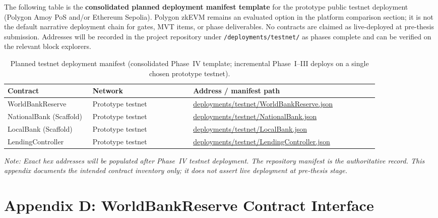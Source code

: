 \documentclass[12pt,a4paper]{report}
\newcommand{\tableheadcolor}{\rowcolor{TableHeadBg}}
\newcommand{\tableheadfont}{\bfseries}
\begin{document}
The following table is the \textbf{consolidated planned deployment manifest template} for the prototype public testnet deployment (Polygon Amoy PoS and/or Ethereum Sepolia). Polygon zkEVM remains an evaluated option in the platform comparison section; it is not the default narrative deployment chain for gates, MVT items, or phase deliverables. No contracts are claimed as live-deployed at pre-thesis submission. Addresses will be recorded in the project repository under \texttt{/deployments/testnet/} as phases complete and can be verified on the relevant block explorers.

\begin{table}[H]
\centering
\caption[Planned testnet deployment manifest]{Planned testnet deployment manifest (consolidated Phase~IV template; incremental Phase~I--III deploys on a single chosen prototype testnet).}
\label{tab:cardona-manifest}
\begingroup
\footnotesize
\setlength{\tabcolsep}{4pt}
\renewcommand{\arraystretch}{1.15}
\begin{tabular}{@{}%
  >{\raggedright\arraybackslash}p{0.22\linewidth}%
  >{\raggedright\arraybackslash}p{0.26\linewidth}%
  >{\raggedright\arraybackslash}p{0.48\linewidth}@{}}
\toprule
\tableheadcolor
\tableheadfont Contract & \tableheadfont Network & \tableheadfont Address / manifest path \\
\midrule
WorldBankReserve & Prototype testnet & \url{deployments/testnet/WorldBankReserve.json} \\
\rowcolor{RowShade}
NationalBank (Scaffold) & Prototype testnet & \url{deployments/testnet/NationalBank.json} \\
LocalBank (Scaffold) & Prototype testnet & \url{deployments/testnet/LocalBank.json} \\
\rowcolor{RowShade}
LendingController & Prototype testnet & \url{deployments/testnet/LendingController.json} \\
\bottomrule
\end{tabular}
\endgroup
\end{table}

\noindent\textit{Note: Exact hex addresses will be populated after Phase~IV testnet deployment. The repository manifest is the authoritative record. This appendix documents the intended contract inventory only; it does not assert live deployment at pre-thesis stage.}


\chapter*{Appendix D: WorldBankReserve Contract Interface}
{}
\end{document}
